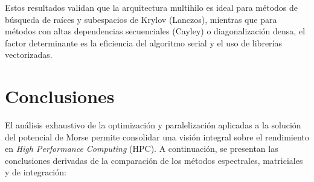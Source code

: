\documentclass[11pt,fleqn]{article}
\begin{document}
Estos resultados validan que la arquitectura multihilo es ideal para métodos de búsqueda de raíces y subespacios de Krylov (Lanczos), mientras que para métodos con altas dependencias secuenciales (Cayley) o diagonalización densa, el factor determinante es la eficiencia del algoritmo serial y el uso de librerías vectorizadas.





\section{Conclusiones}

El análisis exhaustivo de la optimización y paralelización aplicadas a la solución del potencial de Morse permite consolidar una visión integral sobre el rendimiento en \textit{High Performance Computing} (HPC). A continuación, se presentan las conclusiones derivadas de la comparación de los métodos espectrales, matriciales y de integración:
\end{document}
